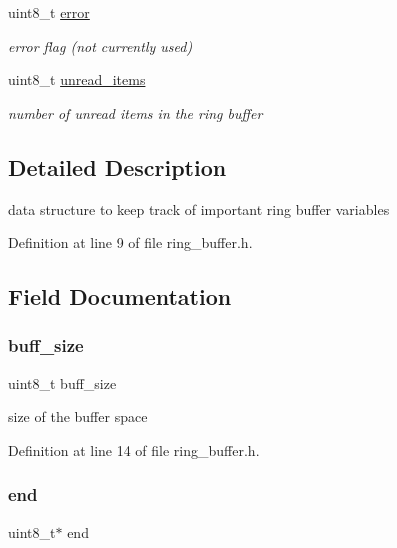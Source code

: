 \begin{DoxyCompactItemize}
uint8\+\_\+t \hyperlink{structring__buffer__t_adc64ccb7538429fe78e3fe0139267370}{error}
\begin{DoxyCompactList}\small\item\em error flag (not currently used) \end{DoxyCompactList}\item 
uint8\+\_\+t \hyperlink{structring__buffer__t_a0ed89f14dd3a8e0a46a901d73c869804}{unread\+\_\+items}
\begin{DoxyCompactList}\small\item\em number of unread items in the ring buffer \end{DoxyCompactList}\end{DoxyCompactItemize}


\subsection{Detailed Description}
data structure to keep track of important ring buffer variables 

Definition at line 9 of file ring\+\_\+buffer.\+h.



\subsection{Field Documentation}
\hypertarget{structring__buffer__t_afd186f1012b3e5a3eca43a965bfa5adb}{}\label{structring__buffer__t_afd186f1012b3e5a3eca43a965bfa5adb} 
\subsubsection{\texorpdfstring{buff\+\_\+size}{buff\_size}}
{\footnotesize\ttfamily uint8\+\_\+t buff\+\_\+size}



size of the buffer space 



Definition at line 14 of file ring\+\_\+buffer.\+h.

\hypertarget{structring__buffer__t_abd1acb187be8f3b30a79336d4962993f}{}\label{structring__buffer__t_abd1acb187be8f3b30a79336d4962993f} 
\subsubsection{\texorpdfstring{end}{end}}
{\footnotesize\ttfamily uint8\+\_\+t$\ast$ end}



